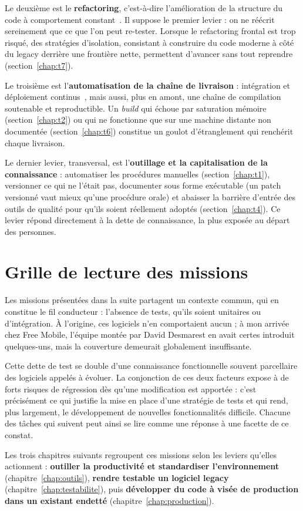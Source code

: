 Le deuxième est le \textbf{refactoring}, c'est-à-dire l'amélioration de la
structure du code à comportement constant~\cite{fowler2018}. Il suppose le
premier levier : on ne réécrit sereinement que ce que l'on peut re-tester.
Lorsque le refactoring frontal est trop risqué, des stratégies d'isolation,
consistant à construire du code moderne à côté du legacy derrière une
frontière nette, permettent d'avancer sans tout reprendre
(section~\ref{chap:t7}).

Le troisième est l'\textbf{automatisation de la chaîne de livraison} :
intégration et déploiement continus~\cite{humble2010}, mais aussi, plus en
amont, une chaîne de compilation soutenable et reproductible. Un \emph{build}
qui échoue par saturation mémoire (section~\ref{chap:t2}) ou qui ne
fonctionne que sur une machine distante non documentée
(section~\ref{chap:t6}) constitue un goulot d'étranglement qui renchérit
chaque livraison.

Le dernier levier, transversal, est l'\textbf{outillage et la capitalisation
de la connaissance} : automatiser les procédures manuelles
(section~\ref{chap:t1}), versionner ce qui ne l'était pas, documenter sous
forme exécutable (un patch versionné vaut mieux qu'une procédure orale) et
abaisser la barrière d'entrée des outils de qualité pour qu'ils soient
réellement adoptés (section~\ref{chap:t4}). Ce levier répond directement à
la dette de connaissance, la plus exposée au départ des personnes.

\section{Grille de lecture des missions}
Les missions présentées dans la suite partagent un contexte commun, qui en
constitue le fil conducteur : l'absence de tests, qu'ils soient unitaires ou
d'intégration. À l'origine, ces logiciels n'en comportaient aucun ; à mon
arrivée chez Free Mobile, l'équipe montée par David Desmarest en avait certes
introduit quelques-uns, mais la couverture demeurait globalement insuffisante.

Cette dette de test se double d'une connaissance fonctionnelle souvent
parcellaire des logiciels appelés à évoluer. La conjonction de ces deux
facteurs expose à de forts risques de régression dès qu'une modification est
apportée : c'est précisément ce qui justifie la mise en place d'une stratégie
de tests et qui rend, plus largement, le développement de nouvelles
fonctionnalités difficile. Chacune des tâches qui suivent peut ainsi se lire
comme une réponse à une facette de ce constat.

Les trois chapitres suivants regroupent ces missions selon les leviers
qu'elles actionnent : \textbf{outiller la productivité et standardiser
l'environnement} (chapitre~\ref{chap:outils}), \textbf{rendre testable un
logiciel legacy} (chapitre~\ref{chap:testabilite}), puis \textbf{développer du
code à visée de production dans un existant endetté}
(chapitre~\ref{chap:production}).

